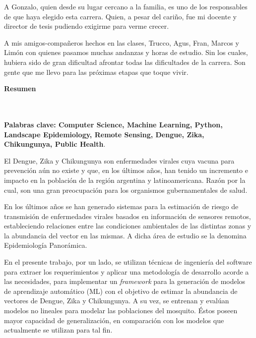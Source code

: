   \par A Gonzalo, quien desde su lugar cercano a la familia, es uno de los
  responsables de que haya elegido esta carrera. Quien, a pesar del cariño,
  fue mi docente y director de tesis pudiendo exigirme para verme crecer.

  \par A mis amigos-compañeros hechos en las clases, Trucco, Agus, Fran, Marcos
  y Limón con quienes pasamos muchas andanzas y horas de estudio. Sin los
  cuales, hubiera sido de gran dificultad afrontar todas las dificultades
  de la carrera. Son gente que
  me llevo para las próximas etapas que toque vivir.


\newpage{\pagestyle{empty}\cleardoublepage}

\newpage
\textbf{\LARGE Resumen}
\\\\

\textbf{\small Palabras clave: Computer Science, Machine Learning, Python,
      Landscape Epidemiology, Remote Sensing, Dengue, Zika, Chikungunya, Public Health}.\\
\justifying
  \par El Dengue, Zika y Chikungunya son enfermedades virales cuya vacuna para
    prevención aún no existe y que, en los últimos años, han tenido un incremento
    e impacto en la población de la región argentina y latinoamericana. Razón
    por la cual, son
    una gran preocupación para los organismos gubernamentales de salud.

  \par En los últimos años se han generado sistemas para la estimación de riesgo de transmisión
    de enfermedades virales basados en información de sensores remotos,
    estableciendo relaciones entre las condiciones ambientales de las distintas
    zonas y la abundancia del vector en las mismas. A dicha área de estudio
    se la denomina Epidemiología Panorámica.

 \par En el presente trabajo, por un lado, se utilizan técnicas de
    ingeniería del software para extraer los requerimientos y aplicar una metodología
    de desarrollo acorde a las necesidades,
    para implementar un \textit{framework} para la generación de modelos de
    aprendizaje automático (ML) con el objetivo
    de estimar la abundancia de vectores de Dengue, Zika y Chikungunya.
    A su vez, se entrenan y evalúan modelos no lineales para modelar las poblaciones del
    mosquito. Éstos poseen mayor
    capacidad de generalización, en comparación con los modelos que
    actualmente se utilizan para tal fin.

